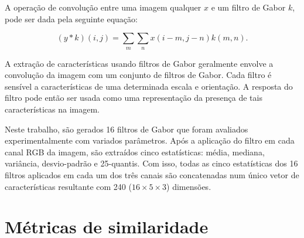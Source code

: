 \begin{figure}[!h]
        \captionsetup{width=12cm}
		\centering
\end{figure}
\FloatBarrier{}

A operação de convolução entre uma imagem qualquer $ x $ e um filtro de
Gabor $ k $, pode ser dada pela seguinte equação:

\begin{equation}
  (y * k)(i, j) = \sum_{m} \sum_{n} x(i-m, j-n) k(m, n).
\end{equation}

A extração de características usando filtros de Gabor geralmente
envolve a convolução da imagem com um conjunto de filtros de
Gabor. Cada filtro é sensível a características de uma determinada
escala e orientação. A resposta do filtro pode então ser usada como
uma representação da presença de tais características na imagem.

Neste trabalho, são gerados 16 filtros de Gabor que foram avaliados
experimentalmente com variados parâmetros. Após a aplicação do filtro
em cada canal RGB da imagem, são extraídos cinco estatísticas: média,
mediana, variância, desvio-padrão e 25-quantis. Com isso, todas as
cinco estatísticas dos 16 filtros aplicados em cada um dos três canais
são concatenadas num único vetor de características resultante com 240
($16 \times 5 \times 3$) dimensões.

\section{Métricas de similaridade}\label{sec:teorica-metricas-de-similaridade}


